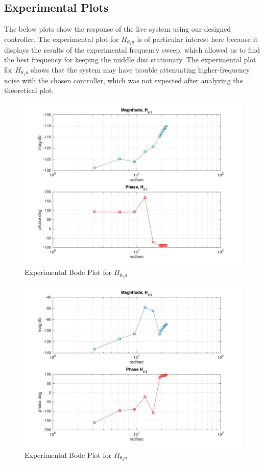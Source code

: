\documentclass[11pt,titlepage]{article}
\begin{document}
    \subsection{Experimental Plots}
    The below plots show the response of the live system using our designed controller. The experimental plot for $H_{\theta_2u}$ is of particular interest here because it displays the results of the experimental frequency sweep, which allowed us to find the best frequency for keeping the middle disc stationary. The experimental plot for $H_{\theta_1u}$ shows that the system may have trouble attenuating higher-frequency noise with the chosen controller, which was not expected after analyzing the theoretical plot.
    
        \begin{figure}[H]
            \centering
            \includegraphics[scale=0.35]{bode_theta1}
            \caption{Experimental Bode Plot for  $H_{\theta_1u}$}
            \label{fig:bode_theta1}
        \end{figure}
        
        \begin{figure}[H]
            \centering
            \includegraphics[scale=0.35]{bode_theta2}
            \caption{Experimental Bode Plot for  $H_{\theta_2u}$}
            \label{fig:bode_theta2}
        \end{figure}
        
\end{document}
